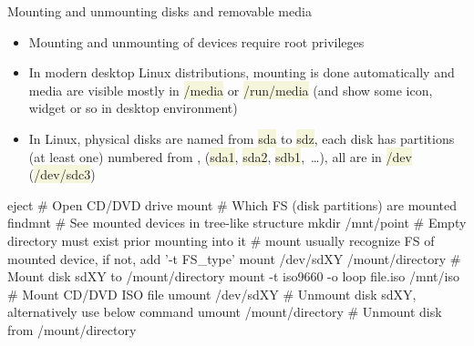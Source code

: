 \documentclass[compress, xelatex, 11pt, xcolor=svgnames, aspectratio=169, url={hyphens, lowtilde}]{beamer}
\renewcommand{\texttt}[1]{\colorbox{Beige}{{\ttfamily #1}}}
\begin{document}
\begin{frame}[fragile]{Mounting and unmounting disks and removable media}
	\begin{itemize}
		\item Mounting and unmounting of devices require root privileges
		\item In modern desktop Linux distributions, mounting is done automatically and media are visible mostly in \texttt{/media} or \texttt{/run/media} (and show some icon, widget or so in desktop environment)
		\item In Linux, physical disks are named from \texttt{sda} to \texttt{sdz}, each disk has partitions (at least one) numbered from \texttt{1}, (\texttt{sda1}, \texttt{sda2}, \texttt{sdb1},~\ldots), all are in \texttt{/dev} (\texttt{/dev/sdc3})
	\end{itemize}
	\begin{bashcode}
    eject # Open CD/DVD drive
    mount # Which FS (disk partitions) are mounted
    findmnt # See mounted devices in tree-like structure
    mkdir /mnt/point # Empty directory must exist prior mounting into it
    # mount usually recognize FS of mounted device, if not, add '-t FS_type'
    mount /dev/sdXY /mount/directory # Mount disk sdXY to /mount/directory
    mount -t iso9660 -o loop file.iso /mnt/iso # Mount CD/DVD ISO file
    umount /dev/sdXY # Unmount disk sdXY, alternatively use below command
    umount /mount/directory # Unmount disk from /mount/directory
	\end{bashcode}
\end{frame}
\end{document}
